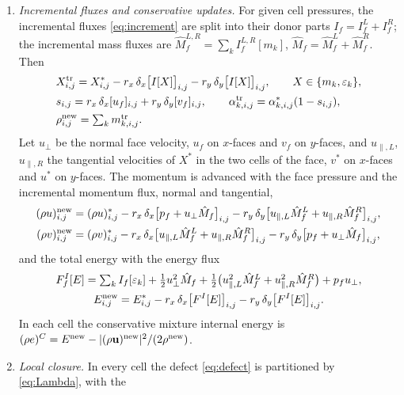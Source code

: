 \begin{enumerate}
ghost cells take the pressure of the adjacent cell, or the given pressure at the outlet of Sec.~\ref{sec:res_bartak}, and their state is a copy of the boundary cells at transmissive
boundaries and their mirror image at walls, with the normal velocity $2u_w-u$ for a wall velocity $u_w$; on a wall face $u_f=u_w$.
\item \emph{Incremental fluxes and conservative updates.} For given cell pressures, the incremental fluxes
\eqref{eq:increment} are split into their donor parts $I_f=I^L_f+I^R_f$; the incremental mass fluxes are
$\hat M^{L,R}_f=\sum_kI^{L,R}_f[m_k]$, $\hat M_f=\hat M^L_f+\hat M^R_f$. Then
\[
\begin{aligned}
&X^{\rm tr}_{i,j}=X^*_{i,j}-r_x\,\delta_x\big[I[X]\big]_{i,j}-r_y\,\delta_y\big[I[X]\big]_{i,j},\qquad X\in\{m_k,\varepsilon_k\},\\
&s_{i,j}=r_x\,\delta_x[u_f]_{i,j}+r_y\,\delta_y[v_f]_{i,j},\qquad \alpha^{\rm tr}_{k,i,j}=\alpha^*_{k,i,j}(1-s_{i,j}),\\
&\rho^{\rm new}_{i,j}=\textstyle\sum_km^{\rm tr}_{k,i,j}.
\end{aligned}
\]
Let $u_\perp$ be the normal face velocity, $u_f$ on $x$-faces and $v_f$ on $y$-faces, and $u_{\parallel,L}$, $u_{\parallel,R}$ the tangential velocities
of $X^*$ in the two cells of the face, $v^*$ on $x$-faces and $u^*$ on $y$-faces. The momentum is advanced with the face
pressure and the incremental momentum flux, normal and tangential,
\[
\begin{aligned}
(\rho u)^{\rm new}_{i,j}&=(\rho u)^*_{i,j}-r_x\,\delta_x\big[p_f+u_\perp\hat M_f\big]_{i,j}-r_y\,\delta_y\big[u_{\parallel,L}\hat M^L_f+u_{\parallel,R}\hat M^R_f\big]_{i,j},\\
(\rho v)^{\rm new}_{i,j}&=(\rho v)^*_{i,j}-r_x\,\delta_x\big[u_{\parallel,L}\hat M^L_f+u_{\parallel,R}\hat M^R_f\big]_{i,j}-r_y\,\delta_y\big[p_f+u_\perp\hat M_f\big]_{i,j},
\end{aligned}
\]
and the total energy with the energy flux
\[
\begin{gathered}
F^I_f[E]=\textstyle\sum_kI_f[\varepsilon_k]+\tfrac12u_\perp^2\hat M_f+\tfrac12\big(u_{\parallel,L}^2\hat M^L_f+u_{\parallel,R}^2\hat M^R_f\big)+p_fu_\perp ,\\
E^{\rm new}_{i,j}=E^*_{i,j}-r_x\,\delta_x\big[F^I[E]\big]_{i,j}-r_y\,\delta_y\big[F^I[E]\big]_{i,j}.
\end{gathered}
\]
In each cell the conservative mixture internal energy is $(\rho e)^C=E^{\rm new}-|(\rho\mathbf u)^{\rm new}|^2/(2\rho^{\rm new})$.
\item \emph{Local closure.} In every cell the defect \eqref{eq:defect} is partitioned by \eqref{eq:Lambda}, with the

\end{enumerate}
